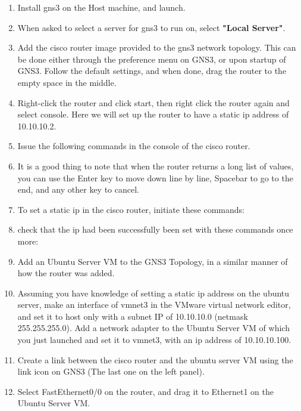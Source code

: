 \documentclass[main.tex]{subfiles}
\begin{document}
\begin{enumerate}[noitemsep,label=$\bullet$,leftmargin=20mm,labelsep=0.5cm]
\item Install gns3 on the Host machine, and launch.


\item When asked to select a server for gns3 to run on, select \textbf{"Local Server"}.

\item Add the cisco router image provided to the gns3 network topology. This can be done either through the preference menu on GNS3, or upon startup of GNS3. Follow the default settings, and when done, drag the router to the empty space in the middle.

\item Right-click the router and click start, then right click the router again and select console. Here we will set up the router to have a static ip address of 10.10.10.2.

\item Issue the following commands in the console of the cisco router.

\item It is a good thing to note that when the router returns a long list of values, you can use the Enter key to move down line by line, Spacebar to go to the end, and any other key to cancel.

\item To set a static ip in the cisco router, initiate these commands:

\item check that the ip had been successfully been set with these commands once more:

\item Add an Ubuntu Server VM to the GNS3 Topology, in a similar manner of how the router was added.

\item Assuming you have knowledge of setting a static ip address on the ubuntu server, make an interface of vmnet3 in the VMware virtual network editor, and set it to host only with a subnet IP of 10.10.10.0 (netmask 255.255.255.0). Add a network adapter to the Ubuntu Server VM of which you just launched and set it to vmnet3, with an ip address of 10.10.10.100.

\item Create a link between the cisco router and the ubuntu server VM using the link icon on GNS3 (The last one on the left panel).
\item Select FastEthernet0/0 on the router, and drag it to Ethernet1 on the Ubuntu Server VM. 


\end{enumerate}
\end{document}
